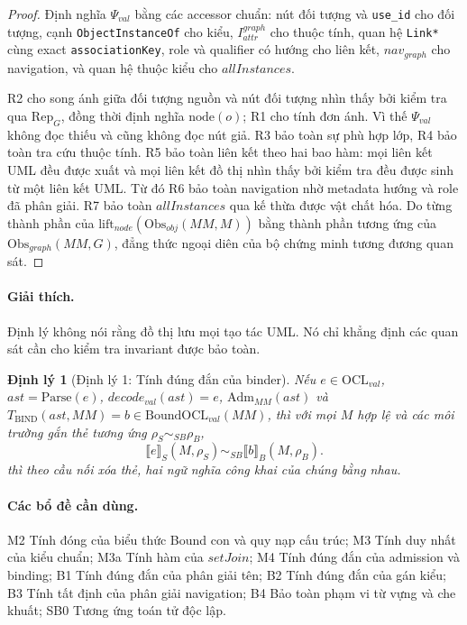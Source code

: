 \documentclass[11pt,a4paper]{article}
\newtheorem{theorem}{Định lý}
\theoremstyle{definition}
\newcommand{\OCLval}{\mathrm{OCL}_{val}}
\newcommand{\BoundOCLval}{\mathrm{BoundOCL}_{val}}
\newcommand{\node}{\mathrm{node}}
\newcommand{\RepG}{\mathrm{Rep}_{G}}
\newcommand{\Adm}{\mathrm{Adm}}
\newcommand{\ObsObj}{\mathrm{Obs}_{obj}}
\newcommand{\ObsGraph}{\mathrm{Obs}_{graph}}
\newcommand{\liftNode}{\mathrm{lift}_{node}}
\newcommand{\sem}[2]{\llbracket #1 \rrbracket_{#2}}
\begin{document}
\begin{proof}
Định nghĩa $\Psi_{val}$ bằng các accessor chuẩn: nút đối tượng và
\texttt{use\_id} cho đối tượng, cạnh \texttt{ObjectInstanceOf} cho kiểu,
$I^{graph}_{attr}$ cho thuộc tính, quan hệ \texttt{Link*} cùng exact
\texttt{associationKey}, role và qualifier có hướng cho liên kết, $nav_{graph}$ cho
navigation, và quan hệ thuộc kiểu cho $allInstances$.

R2 cho song ánh giữa đối tượng nguồn và nút đối tượng nhìn thấy bởi kiểm tra qua
$\RepG$, đồng thời định nghĩa $\node(o)$; R1 cho tính đơn ánh. Vì thế
$\Psi_{val}$ không đọc thiếu và cũng không đọc nút giả. R3 bảo toàn sự phù hợp
lớp, R4 bảo toàn tra cứu thuộc tính. R5 bảo toàn liên kết theo hai bao hàm: mọi
liên kết UML đều được xuất và mọi liên kết đồ thị nhìn thấy bởi kiểm tra đều
được sinh từ một liên kết UML. Từ đó R6 bảo toàn navigation nhờ metadata hướng
và role đã phân giải. R7 bảo toàn $allInstances$ qua kế thừa được vật chất hóa.
Do từng thành phần của $\liftNode(\ObsObj(MM,M))$ bằng thành phần tương ứng của
$\ObsGraph(MM,G)$, đẳng thức ngoại diên của bộ chứng minh tương đương quan sát.
\end{proof}

\paragraph{Giải thích.}
Định lý không nói rằng đồ thị lưu mọi tạo tác UML. Nó chỉ khẳng định các quan
sát cần cho kiểm tra invariant được bảo toàn.

\begin{theorem}[Định lý 1: Tính đúng đắn của binder]
Nếu $e\in\OCLval$, $ast=\mathrm{Parse}(e)$,
$decode_{val}(ast)=e$, $\Adm_{MM}(ast)$ và
$T_{\mathrm{BIND}}(ast,MM)=b\in\BoundOCLval(MM)$, thì với mọi $M$ hợp lệ và
các môi trường gắn thẻ tương ứng $\rho_S\sim_{SB}\rho_B$,
\[
\sem{e}{S}(M,\rho_S)\sim_{SB}\sem{b}{B}(M,\rho_B).
\]
thì theo cầu nối xóa thẻ, hai ngữ nghĩa công khai của chúng bằng nhau.
\end{theorem}

\paragraph{Các bổ đề cần dùng.}
M2 Tính đóng của biểu thức Bound con và quy nạp cấu trúc; M3 Tính duy nhất của
kiểu chuẩn; M3a Tính hàm của $setJoin$; M4 Tính đúng đắn của admission và binding;
B1 Tính đúng đắn của
phân giải tên; B2 Tính đúng đắn của gán kiểu; B3 Tính tất định của phân giải
navigation; B4 Bảo toàn phạm vi từ vựng và che khuất; SB0 Tương ứng toán tử độc lập.
\end{document}
